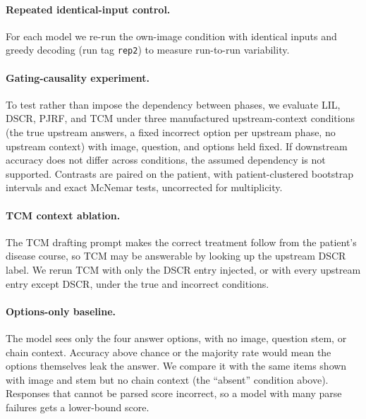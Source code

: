 \documentclass[11pt]{article}
\begin{document}
\paragraph{Repeated identical-input control.} For each model we re-run the own-image condition with identical inputs and greedy decoding (run tag \texttt{rep2}) to measure run-to-run variability.

\paragraph{Gating-causality experiment.}\label{sec:gating-causality} To test rather than impose the dependency between phases, we evaluate LIL, DSCR, PJRF, and TCM under three manufactured upstream-context conditions (the true upstream answers, a fixed incorrect option per upstream phase, no upstream context) with image, question, and options held fixed. If downstream accuracy does not differ across conditions, the assumed dependency is not supported. Contrasts are paired on the patient, with patient-clustered bootstrap intervals and exact McNemar tests, uncorrected for multiplicity.

\paragraph{TCM context ablation.} The TCM drafting prompt makes the correct treatment follow from the patient's disease course, so TCM may be answerable by looking up the upstream DSCR label. We rerun TCM with only the DSCR entry injected, or with every upstream entry except DSCR, under the true and incorrect conditions.

\paragraph{Options-only baseline.} The model sees only the four answer options, with no image, question stem, or chain context. Accuracy above chance or the majority rate would mean the options themselves leak the answer. We compare it with the same items shown with image and stem but no chain context (the ``absent'' condition above). Responses that cannot be parsed score incorrect, so a model with many parse failures gets a lower-bound score.
\end{document}
